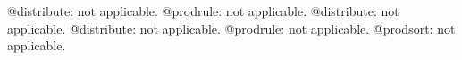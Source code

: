 \documentclass[11pt]{article}
\begin{document}
@distribute: not applicable.
@prodrule: not applicable.
@distribute: not applicable.
@distribute: not applicable.
@prodrule: not applicable.
@prodsort: not applicable.
\end{document}
